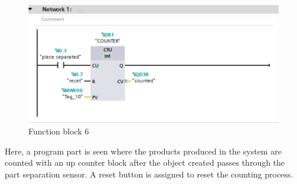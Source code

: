 \begin{figure}[H]
    \centering
    \includegraphics[width=0.60\columnwidth]{imgs/io/tia8.jpg}
    \caption[Function block 6]{Function block 6}
    \label{fig-magnitude}
\end{figure}%
Here, a program part is seen where the products produced in the system are counted with an up counter block after the object created passes through the part separation sensor. A reset button is assigned to reset the counting process.

